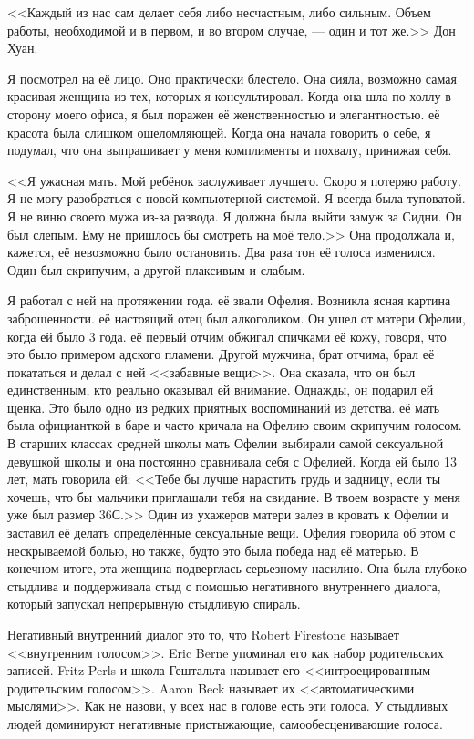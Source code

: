\documentclass[10pt, fleqn]{article}
\begin{document}
<<Каждый из нас сам делает себя либо несчастным, либо сильным. Объем работы, необходимой и в первом, и во втором случае, — один и тот же.>> Дон Хуан.

Я посмотрел на её лицо. Оно практически блестело. Она сияла, возможно самая красивая женщина из тех, которых я консультировал. Когда она шла по холлу в сторону моего офиса, я был поражен её женственностью и элегантностью. её красота была слишком ошеломляющей. Когда она начала говорить о себе, я подумал, что она выпрашивает у меня комплименты и похвалу, принижая себя.

<<Я ужасная мать. Мой ребёнок заслуживает лучшего. Скоро я потеряю работу. Я не могу разобраться с новой компьютерной системой. Я всегда была туповатой. Я не виню своего мужа из-за развода. Я должна была выйти замуж за Сидни. Он был слепым. Ему не пришлось бы смотреть на моё тело.>> Она продолжала и, кажется, её невозможно было остановить. Два раза тон её голоса изменился. Один был скрипучим, а другой плаксивым и слабым.

Я работал с ней на протяжении года. её звали Офелия. Возникла ясная картина заброшенности. её настоящий отец был алкоголиком. Он ушел от матери Офелии, когда ей было 3 года. её первый отчим обжигал спичками её кожу, говоря, что это было примером адского пламени. Другой мужчина, брат отчима, брал её покататься и делал с ней <<забавные вещи>>. Она сказала, что он был единственным, кто реально оказывал ей внимание. Однажды, он подарил ей щенка. Это было одно из редких приятных воспоминаний из детства. её мать была официанткой в баре и часто кричала на Офелию своим скрипучим голосом. В старших классах средней школы мать Офелии выбирали самой сексуальной девушкой школы и она постоянно сравнивала себя с Офелией. Когда ей было 13 лет, мать говорила ей: <<Тебе бы лучше нарастить грудь и задницу, если ты хочешь, что бы мальчики приглашали тебя на свидание. В твоем возрасте у меня уже был размер 36С.>> Один из ухажеров матери залез в кровать к Офелии и заставил её делать определённые сексуальные вещи. Офелия говорила об этом с нескрываемой болью, но также, будто это была победа над её матерью. В конечном итоге, эта женщина подверглась серьезному насилию. Она была глубоко стыдлива и поддерживала стыд с помощью негативного внутреннего диалога, который запускал непрерывную стыдливую спираль.


Негативный внутренний диалог это то, что Robert Firestone называет <<внутренним голосом>>. Eric Berne упоминал его как набор родительских записей. Fritz Perls и школа Гештальта называет его <<интроецированным родительским голосом>>. Aaron Beck называет их <<автоматическими мыслями>>. Как не назови, у всех нас в голове есть эти голоса. У стыдливых людей доминируют негативные пристыжающие, самообесценивающие голоса.
\end{document}
